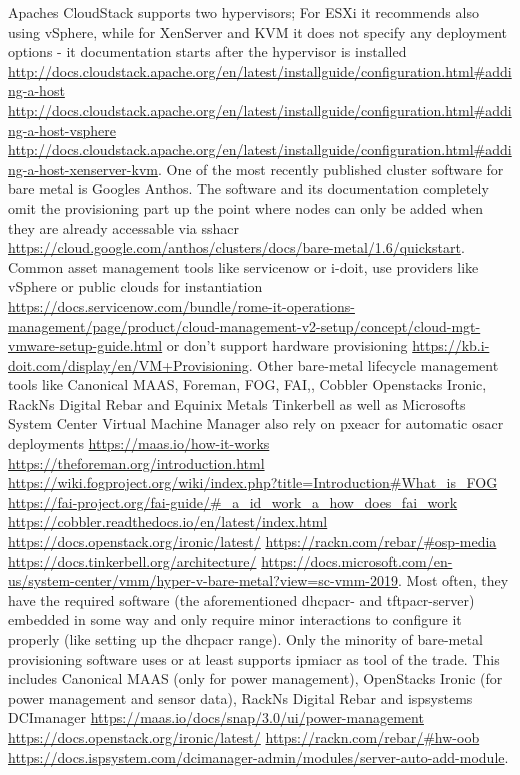 Apaches CloudStack supports two hypervisors; For ESXi it recommends also using vSphere, while for XenServer and KVM it does not specify any deployment options - it documentation starts after the hypervisor is installed \url{http://docs.cloudstack.apache.org/en/latest/installguide/configuration.html#adding-a-host} \url{http://docs.cloudstack.apache.org/en/latest/installguide/configuration.html#adding-a-host-vsphere} \url{http://docs.cloudstack.apache.org/en/latest/installguide/configuration.html#adding-a-host-xenserver-kvm}.
\newline
One of the most recently published cluster software for bare metal is Googles Anthos. The software and its documentation completely omit the provisioning part up the point where nodes can only be added when they are already accessable via \gls{sshacr} \url{https://cloud.google.com/anthos/clusters/docs/bare-metal/1.6/quickstart}.
\newline
Common asset management tools like servicenow or i-doit, use providers like vSphere or public clouds for instantiation \url{https://docs.servicenow.com/bundle/rome-it-operations-management/page/product/cloud-management-v2-setup/concept/cloud-mgt-vmware-setup-guide.html} or don't support hardware provisioning \url{https://kb.i-doit.com/display/en/VM+Provisioning}.
\newline
Other bare-metal lifecycle management tools like Canonical MAAS, Foreman, FOG, FAI,, Cobbler Openstacks Ironic, RackNs Digital Rebar and Equinix Metals Tinkerbell as well as Microsofts System Center Virtual Machine Manager also rely on \gls{pxeacr} for automatic \gls{osacr} deployments \url{https://maas.io/how-it-works} \url{https://theforeman.org/introduction.html} \url{https://wiki.fogproject.org/wiki/index.php?title=Introduction#What_is_FOG} \url{https://fai-project.org/fai-guide/#_a_id_work_a_how_does_fai_work} \url{https://cobbler.readthedocs.io/en/latest/index.html} \url{https://docs.openstack.org/ironic/latest/} \url{https://rackn.com/rebar/#osp-media} \url{https://docs.tinkerbell.org/architecture/} \url{https://docs.microsoft.com/en-us/system-center/vmm/hyper-v-bare-metal?view=sc-vmm-2019}. Most often, they have the required software (the aforementioned \gls{dhcpacr}- and \gls{tftpacr}-server) embedded in some way and only require minor interactions to configure it properly (like setting up the \gls{dhcpacr} range).
\newline
Only the minority of bare-metal provisioning software uses or at least supports \gls{ipmiacr} as tool of the trade. This includes Canonical MAAS (only for power management), OpenStacks Ironic (for power management and sensor data), RackNs Digital Rebar and ispsystems DCImanager \url{https://maas.io/docs/snap/3.0/ui/power-management} \url{https://docs.openstack.org/ironic/latest/} \url{https://rackn.com/rebar/#hw-oob} \url{https://docs.ispsystem.com/dcimanager-admin/modules/server-auto-add-module}.
